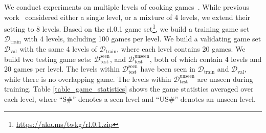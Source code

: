 \documentclass[11pt]{article}
\begin{document}
We conduct experiments on multiple levels of cooking games~\cite{cote2018textworld}. 
While previous work~\cite{adhikari2020gatav2} considered either a single level, or a mixture of 4 levels, we extend their setting to 8 levels. 
Based on the rl.0.1 game set\footnote{\url{https://aka.ms/twkg/rl.0.1.zip}}, we build a training game set $\mathcal{D}_{\text{train}}$ with 4 levels, including 100 games per level. 
We build a validating game set $\mathcal{D}_{\text{val}}$ with the same 4 levels of $\mathcal{D}_{\text{train}}$, where each level contains 20 games.
We build two testing game sets: $\mathcal{D}_{\text{test}}^{\text{seen}}$, and $\mathcal{D}_{\text{test}}^{\text{unseen}}$, both of which contain 4 levels and 20 games per level.
The levels within $\mathcal{D}_{\text{test}}^{\text{seen}}$ have been seen in $\mathcal{D}_{\text{train}}$ and $\mathcal{D}_{\text{val}}$, while there is no overlapping game. 
The levels within $\mathcal{D}_{\text{test}}^{\text{unseen}}$ are unseen during training. 
Table \ref{table_game_statistics} shows the game statistics averaged over each level, where ``S\#'' denotes a seen level and ``US\#'' denotes an unseen level.

\begin{table}[t!]
\caption{\label{table_game_statistics} Game statistics. ``\#Ings'' denotes the number of ingredients, ``\#Reqs'' denotes the requirements, and ``\#Acts'' denotes the admissible actions per time step.}
\centering
{}
\end{table}
\end{document}
